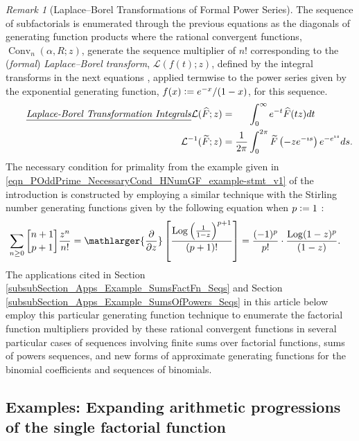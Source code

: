 \documentclass[12pt,reqno]{article}
\numberwithin{sfootnote}{section}
\numberwithin{equation}{section}
\newcommand{\tagtext}[1]{\tag*{\underline{\textit{#1}}}}
\theoremstyle{plain}
\theoremstyle{definition}
\theoremstyle{remark}
\newtheorem{remark}[theorem]{Remark}
\newcommand{\cf}[0]{cf.\ }
\newcommand{\defequals}{\ensuremath{\vcentcolon=}}
\newcommand{\gkpSI}[2]{\ensuremath{\genfrac{\lbrack}{\rbrack}{0pt}{}{#1}{#2}}}
\newcommand{\ConvGF}[4]{\ensuremath{\Conv_{#1}\left(#2, #3; #4\right)}}
\DeclareMathOperator{\Log}{Log}
\DeclareMathOperator{\Conv}{Conv}
\begin{document}
\begin{remark}[Laplace--Borel Transformations of Formal Power Series] 
\label{remark_Formal_Laplace-Borel_Transforms} 
The sequence of subfactorials is enumerated through the 
previous equations as the diagonals of generating function products 
where the rational convergent functions, $\ConvGF{n}{\alpha}{R}{z}$, 
generate the sequence multiplier of $n!$ 
corresponding to the (\emph{formal}) \emph{Laplace--Borel transform}, 
$\mathcal{L}(f(t); z)$, defined by the integral transforms in the next 
equations 
\citep[\cf \S 2.2]{FLAJOLET80B} 
\citep[\S B.4]{ACOMB-BOOK} \citep[p.\ 566]{GKP}, 
applied termwise to the power series given by the 
exponential generating function, $f(x) \defequals e^{-x} / (1-x)$, 
for this sequence. 
\begin{align*} 
\tagtext{Laplace-Borel Transformation Integrals} 
\mathcal{L}(\widehat{F}; z) & = 
     \phantom{\frac{1}{2\pi}} \int_0^{\infty} e^{-t} \widehat{F}(tz) dt \\ 
\mathcal{L}^{-1}(\widetilde{F}; z) & = 
     \frac{1}{2\pi} \int_0^{2\pi} 
     \widetilde{F}\left(-z e^{-\imath s}\right) 
     e^{-e^{\imath s}} ds. 
\end{align*} 
The necessary condition for primality from the example given in 
\eqref{eqn_POddPrime_NecessaryCond_HNumGF_example-stmt_v1} of the introduction 
is constructed by employing a similar technique with the 
Stirling number generating functions given by the following equation 
when $p \defequals 1$ \citep[\S 7.4]{GKP}: 
\begin{align*} 
\sum_{n \geq 0} \gkpSI{n+1}{p+1} \frac{z^{n}}{n!} & = 
     \mathlarger{\frac{\partial}{\partial z}} \left[ 
     \frac{\Log\left(\frac{1}{1-z}\right)^{p+1}}{(p+1)!} 
     \right] = 
     \frac{(-1)^{p}}{p!} \cdot \frac{\Log(1-z)^{p}}{(1-z)}. 
\end{align*} 
The applications cited in 
Section \ref{subsubSection_Apps_Example_SumsFactFn_Seqs} and 
Section \ref{subsubSection_Apps_Example_SumsOfPowers_Seqs} 
in this article below 
employ this particular generating function technique to enumerate the 
factorial function multipliers provided by 
these rational convergent functions in several particular cases of 
sequences involving finite sums over factorial functions, 
sums of powers sequences, and new forms of approximate 
generating functions for the binomial coefficients and 
sequences of binomials. 
\end{remark} 

\subsection{Examples: Expanding arithmetic progressions of the 
            single factorial function} 
\label{subsubSection_Apps_ArithmeticProgs_of_the_SgFactFns} 
\end{document}
